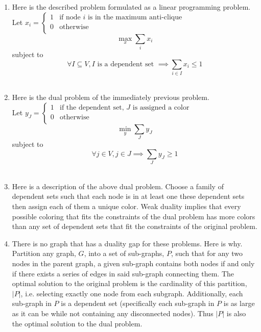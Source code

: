 \documentclass[12pt,oneside]{amsart}
\numberwithin{equation}{section}
\numberwithin{figure}{section}
\theoremstyle{plain}
\theoremstyle{definition}
\begin{document}
\begin{enumerate}
  \item Here is the described problem formulated as a linear programming problem. \\
    Let $x_i = \begin{cases}
      1 & \text{if node } i \text{ is in the maximum anti-clique} \\
      0 & \text{otherwise} \\
    \end{cases}$
    \[\max_{x}\sum_{i}x_i\]
    subject to
    \[\forall I \subseteq V, I \text{ is a dependent set } \implies 
    \sum_{i \in I} x_i \leq 1\] \\
  \item Here is the dual problem of the immediately previous problem. \\
    Let $y_J = \begin{cases}
      1 & \text{if the dependent set, } J \text{ is assigned a color} \\
      0 & \text{otherwise} \\
    \end{cases}$
    \[\min_{y}\sum_{J}y_J\]
    subject to
    \[\forall j \in V, j \in J \implies \sum_{J}y_J \geq 1\] \\
  \item Here is a description of the above dual problem. Choose a family of 
    dependent sets such that each node is in at least one these dependent sets 
    then assign each of them a unique color. Weak duality implies that every 
    possible coloring that fits the constraints of the dual problem has more 
    colors than any set of dependent sets that fit the constraints of the 
    original problem. \\
  \item There is no graph that has a duality gap for these problems. Here is why. 
    Partition any graph, $G$, into a set of sub-graphs, $P$, such that for any 
    two nodes in the parent graph, a given sub-graph contains both nodes if and 
    only if there exists a series of edges in said sub-graph connecting them. The 
    optimal solution to the original problem is the cardinality of this 
    partition, $|P|$, i.e. selecting exactly one node from each subgraph. 
    Additionally, each sub-graph in $P$ is a dependent set (specifically each 
    sub-graph in $P$ is as large as it can be while not containing any 
    disconnected nodes). Thus $|P|$ is also the optimal solution to the dual 
    problem.
\end{enumerate}
\end{document}
